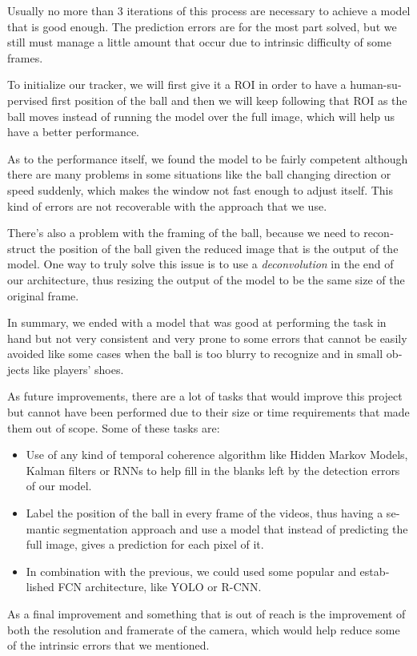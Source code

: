 \begin{otherlanguage}{english}
Usually no more than 3 iterations of this process are necessary to achieve a model that is good enough. The prediction errors are for the most part solved, but we still must manage a little amount that occur due to intrinsic difficulty of some frames.

To initialize our tracker, we will first give it a ROI in order to have a human-supervised first position of the ball and then we will keep following that ROI as the ball moves instead of running the model over the full image, which will help us have a better performance.

As to the performance itself, we found the model to be fairly competent although there are many problems in some situations like the ball changing direction or speed suddenly, which makes the window not fast enough to adjust itself. This kind of errors are not recoverable with the approach that we use.

There's also a problem with the framing of the ball, because we need to reconstruct the position of the ball given the reduced image that is the output of the model. One way to truly solve this issue is to use a \textit{deconvolution} in the end of our architecture, thus resizing the output of the model to be the same size of the original frame.

In summary, we ended with a model that was good at performing the task in hand but not very consistent and very prone to some errors that cannot be easily avoided like some cases when the ball is too blurry to recognize and in small objects like players’ shoes.

As future improvements, there are a lot of tasks that would improve this project but cannot have been performed due to their size or time requirements that made them out of scope. Some of these tasks are:

\begin{itemize}
    \item Use of any kind of temporal coherence algorithm like Hidden Markov Models, Kalman filters or RNNs to help fill in the blanks left by the detection errors of our model.
    \item Label the position of the ball in every frame of the videos, thus having a semantic segmentation approach and use a model that instead of predicting the full image, gives a prediction for each pixel of it.
    \item In combination with the previous, we could used some popular and established FCN architecture, like YOLO or R-CNN.
\end{itemize}

As a final improvement and something that is out of reach is the improvement of both the resolution and framerate of the camera, which would help reduce some of the intrinsic errors that we mentioned.

\end{otherlanguage}
\newpage